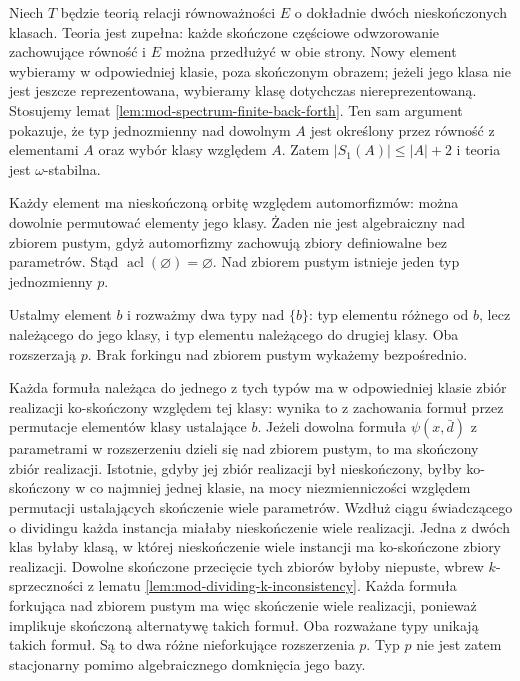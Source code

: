 \begin{przyklad}
\label{ex:mod-nonstationary-algebraically-closed}
Niech $T$ będzie teorią relacji równoważności
$E$ o dokładnie dwóch nieskończonych klasach.
Teoria jest zupełna: każde skończone częściowe
odwzorowanie zachowujące równość i $E$ można
przedłużyć w obie strony. Nowy element wybieramy
w odpowiedniej klasie, poza skończonym obrazem;
jeżeli jego klasa nie jest jeszcze reprezentowana,
wybieramy klasę dotychczas niereprezentowaną.
Stosujemy lemat \ref{lem:mod-spectrum-finite-back-forth}.
Ten sam argument pokazuje, że typ jednozmienny
nad dowolnym $A$ jest określony przez równość
z elementami $A$ oraz wybór klasy względem $A$.
Zatem $|S_1(A)|\leq |A|+2$ i teoria jest
$\omega$-stabilna.

Każdy element ma nieskończoną orbitę względem
automorfizmów: można dowolnie permutować
elementy jego klasy. Żaden nie jest algebraiczny
nad zbiorem pustym, gdyż automorfizmy zachowują
zbiory definiowalne bez parametrów.
Stąd $\operatorname{acl}(\varnothing)=\varnothing$.
Nad zbiorem pustym istnieje jeden typ
jednozmienny $p$.

Ustalmy element $b$ i rozważmy dwa typy nad
$\{b\}$: typ elementu różnego od $b$, lecz
należącego do jego klasy, i typ elementu
należącego do drugiej klasy. Oba rozszerzają $p$.
Brak forkingu nad zbiorem pustym
wykażemy bezpośrednio.

Każda formuła należąca do jednego z tych typów
ma w odpowiedniej klasie zbiór realizacji
ko-skończony względem tej klasy: wynika to
z zachowania formuł przez permutacje elementów
klasy ustalające $b$. Jeżeli dowolna formuła
$\psi(x,\bar d)$ z parametrami w rozszerzeniu
dzieli się nad zbiorem pustym, to ma skończony
zbiór realizacji. Istotnie, gdyby jej zbiór
realizacji był nieskończony, byłby ko-skończony
w co najmniej jednej klasie, na mocy
niezmienniczości względem permutacji ustalających
skończenie wiele parametrów. Wzdłuż ciągu
świadczącego o dividingu każda instancja
miałaby nieskończenie wiele realizacji.
Jedna z dwóch klas byłaby klasą, w której
nieskończenie wiele instancji ma ko-skończone
zbiory realizacji. Dowolne skończone
przecięcie tych zbiorów byłoby niepuste,
wbrew $k$-sprzeczności z lematu
\ref{lem:mod-dividing-k-inconsistency}.
Każda formuła forkująca nad zbiorem pustym
ma więc skończenie wiele realizacji, ponieważ
implikuje skończoną alternatywę takich formuł.
Oba rozważane typy unikają takich formuł.
Są to dwa różne nieforkujące rozszerzenia $p$.
Typ $p$ nie jest zatem stacjonarny pomimo
algebraicznego domknięcia jego bazy.
\end{przyklad}

